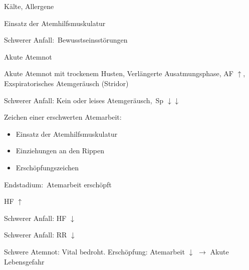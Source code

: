 {
\begin{ABCDESlide}
  \item[\ABCDE{1}] Kälte, Allergene
  \item[\ABCDE{2}] Einsatz der Atemhilfsmuskulatur
  \item[\ABCDE{3}] Schwerer Anfall:
  {\RedFlag}\,Bewusstseinsstörungen
  \item[\ABCDE{4}] Akute Atemnot
  \item[\ABCDE{B}] Akute Atemnot mit trockenem
  Husten, Verlängerte Ausatmungsphase, AF $\uparrow$,
  Exspiratorisches Atemgeräusch (Stridor)
  
  Schwerer Anfall: Kein oder leises Atemgeräusch,
  {\RedFlag}\,Sp $\downarrow\downarrow$
  
  {Zeichen einer erschwerten Atemarbeit}:
  \begin{itemize}
    \item Einsatz der Atemhilfsmuskulatur
    \item Einziehungen an den Rippen
    \item Erschöpfungszeichen
  \end{itemize}
 
  Endstadium: {\RedFlag}\,Atemarbeit erschöpft
  \item[\ABCDE{C}] HF $\uparrow$
  
  Schwerer Anfall: HF $\downarrow$
  \item[\ABCDE{D}] 
  Schwerer Anfall: RR $\downarrow$
  \item[\ABCDE{=}] Schwere Atemnot: Vital bedroht.
  Erschöpfung: Atemarbeit $\downarrow$ $\rightarrow$ Akute Lebensgefahr
\end{ABCDESlide}
}
{}
{}
{}





